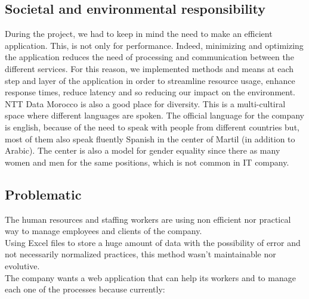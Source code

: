 \documentclass[12pt,a4paper,table,english]{article}
\begin{document}
	\subsection{Societal and environmental responsibility}
	
	During the project, we had to keep in mind the need to make an efficient application. This, is not only for performance. Indeed, minimizing and optimizing the application reduces the need of processing and communication between the different services. For this reason, we implemented methods and means at each step and layer of the application in order to streamline resource usage, enhance response times, reduce latency and so reducing our impact on the environment.\\
	
	NTT Data Morocco is also a good place for diversity. This is a multi-cultiral space where different languages are spoken. The official language for the company is english, because of the need to speak with people from different countries but, most of them also speak fluently Spanish in the center of Martil (in addition to Arabic). The center is also a model for gender equality since there as many women and men for the same positions, which is not common in IT company.
	
	
	\subsection{Problematic}
	
	
	The human resources and staffing workers are using non efficient nor practical way to manage employees and clients of the company.\\
	Using Excel files to store a huge amount of data with the possibility of error and not necessarily normalized practices, this method wasn't maintainable nor evolutive.\\
	
	\noindent The company wants a web application that can help its workers and to manage each one of the processes because currently:
	
\end{document}
